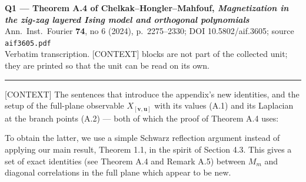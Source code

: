 \documentclass[11pt]{article}
\begin{document}
\begin{center}
{\large\bfseries Q1 --- Theorem A.4 of Chelkak--Hongler--Mahfouf, \emph{Magnetization in
the zig-zag layered Ising model and orthogonal polynomials}}\\[2pt]
{\small Ann.\ Inst.\ Fourier \textbf{74}, no 6 (2024), p.\ 2275--2330; DOI 10.5802/aif.3605;
source \texttt{aif3605.pdf}}\\[6pt]
{\small Verbatim transcription. \textsf{[CONTEXT]} blocks are not part of the collected
unit; they are printed so that the unit can be read on its own.}
\end{center}

\medskip
\hrule
\medskip



\textsf{[CONTEXT]} The sentences that introduce the appendix's new identities, and the
setup of the full-plane observable $X_{[\mathbf{v},\mathbf{u}]}$ with its values
(A.1) and its Laplacian at the branch points (A.2) --- both of which the proof of
Theorem A.4 uses:

To obtain the latter, we use a simple Schwarz reflection argument instead
of applying our main result, Theorem 1.1, in the spirit of Section 4.3. This
gives a set of exact identities (see Theorem A.4 and Remark A.5) between
$M_m$ and diagonal correlations in the full plane which appear to be new.
\end{document}
